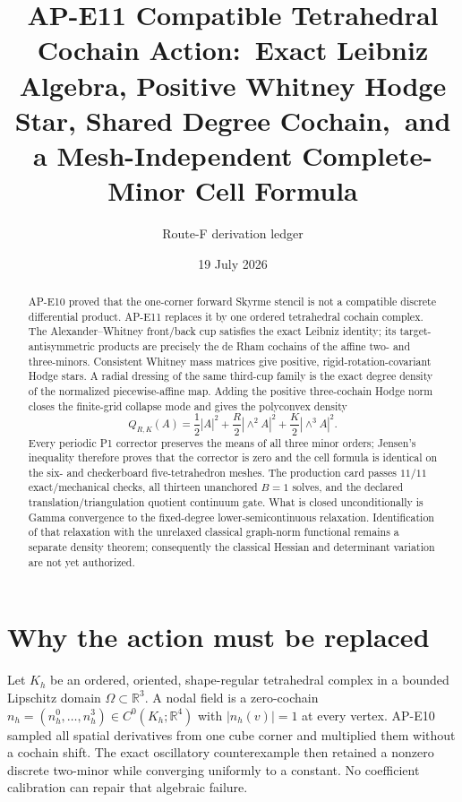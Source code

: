 \documentclass[11pt]{article}
\title{AP-E11 Compatible Tetrahedral Cochain Action:\
Exact Leibniz Algebra, Positive Whitney Hodge Star, Shared Degree Cochain,\
and a Mesh-Independent Complete-Minor Cell Formula}
\author{Route-F derivation ledger}
\date{19 July 2026}
\newcommand{\RR}{\mathbb R}
\begin{document}
\maketitle

\begin{abstract}
AP-E10 proved that the one-corner forward Skyrme stencil is not a compatible
discrete differential product.  AP-E11 replaces it by one ordered
tetrahedral cochain complex.  The Alexander--Whitney front/back cup satisfies
the exact Leibniz identity; its target-antisymmetric products are precisely
the de Rham cochains of the affine two- and three-minors.  Consistent Whitney
mass matrices give positive, rigid-rotation-covariant Hodge stars.  A radial
dressing of the same third-cup family is the exact degree density of the
normalized piecewise-affine map.  Adding the positive three-cochain Hodge
norm closes the finite-grid collapse mode and gives the polyconvex density
\[
 Q_{R,K}(A)=\frac12|A|^2+\frac R2|\wedge^2A|^2
              +\frac K2|\wedge^3A|^2 .
\]
Every periodic P1 corrector preserves the means of all three minor orders;
Jensen's inequality therefore proves that the corrector is zero and the cell
formula is identical on the six- and checkerboard five-tetrahedron meshes.
The production card passes $11/11$ exact/mechanical checks, all thirteen
unanchored $B=1$ solves, and the declared translation/triangulation quotient
continuum gate.  What is closed unconditionally is Gamma convergence to the
fixed-degree lower-semicontinuous relaxation.  Identification of that
relaxation with the unrelaxed classical graph-norm functional remains a
separate density theorem; consequently the classical Hessian and determinant
variation are not yet authorized.
\end{abstract}

\tableofcontents

\section{Why the action must be replaced}

Let $K_h$ be an ordered, oriented, shape-regular tetrahedral complex in a
bounded Lipschitz domain $\Omega\subset\RR^3$.  A nodal field is a
zero-cochain $n_h=(n_h^0,\ldots,n_h^3)\in C^0(K_h;\RR^4)$ with
$|n_h(v)|=1$ at every vertex.  AP-E10 sampled all spatial derivatives from
one cube corner and multiplied them without a cochain shift.  The exact
oscillatory counterexample then retained a nonzero discrete two-minor while
converging uniformly to a constant.  No coefficient calibration can repair
that algebraic failure.
\end{document}
